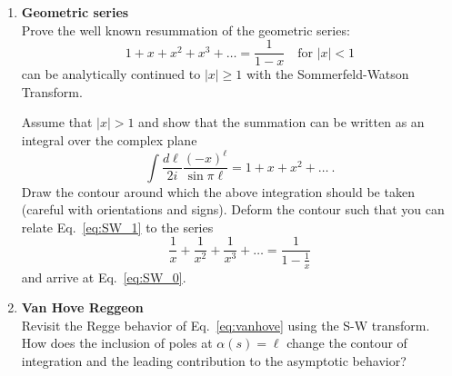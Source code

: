 
\begin{enumerate}
    \item \textbf{Geometric series} \\
          Prove the well known resummation of the geometric series:
          \begin{equation}\label{eq:SW_0}
              1 + x + x^2 + x^3 + \dots =  \frac{1}{1-x} \quad \text{for } |x| < 1
          \end{equation}
          can be analytically continued to $|x| \geq 1$ with the Sommerfeld-Watson Transform.

          Assume that $|x| > 1$ and show that the summation can be written as an integral over the complex plane
          \begin{equation}
              \label{eq:SW_1}
              \int \frac{d\ell}{2i} \frac{(-x)^\ell}{\sin \pi \ell} = 1 + x + x^2 + \dots ~.
          \end{equation}
          Draw the contour around which the above integration should be taken (careful with orientations and signs).
          Deform the contour such that you can relate Eq.~\ref{eq:SW_1} to the series
          \begin{equation}
              \frac{1}{x} + \frac{1}{x^2} + \frac{1}{x^3} + \dots = \frac{1}{1- \frac{1}{x}}
          \end{equation}
          and arrive at Eq.~\ref{eq:SW_0}.

    \item \textbf{Van Hove Reggeon} \\
          Revisit the Regge behavior of Eq.~\ref{eq:vanhove} using the S-W transform. How does the inclusion of poles at $\alpha(s) = \ell$ change the contour of integration and the leading contribution to the asymptotic behavior?
\end{enumerate}